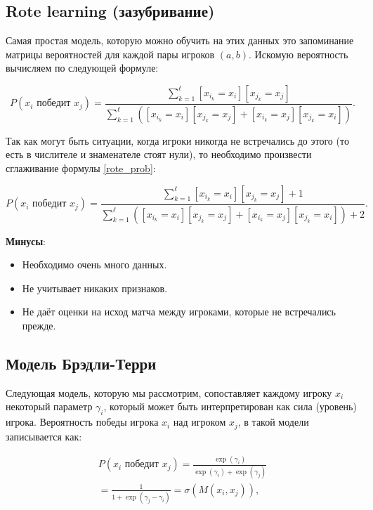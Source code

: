 \documentclass[12pt,a4paper]{article}
\begin{document}
\subsection{Rote learning (зазубривание)}

Самая простая модель, которую можно обучить на этих данных это запоминание матрицы вероятностей для каждой пары игроков $(a,b)$. Искомую вероятность вычисляем по следующей формуле:

\begin{equation}
	P(x_i \text{ победит } x_j) = \frac{\sum_{k=1}^\ell [x_{i_k} = x_i][x_{j_k} = x_j]}{\sum_{k=1}^\ell ([x_{i_k} = x_i][x_{j_k} = x_j] + [x_{i_k} = x_j][x_{j_k} = x_i])}.
	\label{rote_prob}
\end{equation}

\par Так как могут быть ситуации, когда игроки никогда не встречались до этого (то есть в числителе и знаменателе стоят нули), то необходимо произвести сглаживание формулы \eqref{rote_prob}:

\begin{equation*}
	P(x_i \text{ победит } x_j) = \frac{\sum_{k=1}^\ell [x_{i_k} = x_i][x_{j_k} = x_j] + 1}{\sum_{k=1}^\ell ([x_{i_k} = x_i][x_{j_k} = x_j] + [x_{i_k} = x_j][x_{j_k} = x_i]) + 2}.
\end{equation*}

\textbf{Минусы}:
\begin{itemize}
	\item Необходимо очень много данных.
	\item Не учитывает никаких признаков.
	\item Не даёт оценки на исход матча между игроками, которые не встречались прежде.
\end{itemize}

\subsection{Модель Брэдли-Терри}

Следующая модель, которую мы рассмотрим, сопоставляет каждому игроку $x_i$ некоторый параметр $\gamma_i$, который может быть интерпретирован как сила (уровень) игрока. Вероятность победы игрока $x_i$ над игроком $x_j$, в такой модели записывается как:

\begin{align*}
	P(x_i \text{ победит } x_j) = \frac{\exp(\gamma_i)}{\exp(\gamma_i) + \exp(\gamma_j)}\\
	= \frac{1}{1 + \exp(\gamma_j - \gamma_i)} = \sigma(M(x_i, x_j)),
\end{align*}
\end{document}
